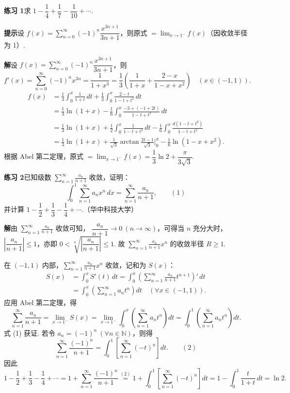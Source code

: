 \documentclass[UTF8, 12pt, fontset=fandol, oneside]{ctexart}
\begin{document}
\noindent\textbf{练习 1}\quad 求 $1-\dfrac14+\dfrac17-\dfrac1{10}+\cdots$.

\noindent\textbf{提示}\quad 设
$f(x)=\displaystyle\sum_{n=0}^{\infty}(-1)^n\dfrac{x^{3n+1}}{3n+1}$，则原式
$=\displaystyle\lim_{x\to1^-}f(x)$（因收敛半径为 1）.

\noindent\textbf{解}\quad 设 $f(x)=\displaystyle\sum_{n=0}^{\infty}(-1)^n\dfrac{x^{3n+1}}{3n+1}$，则
\[
  f'(x)=\sum_{n=0}^{\infty}(-1)^nx^{3n}
  =\frac1{1+x^3}
  =\frac13\left(\frac1{1+x}+\frac{2-x}{1-x+x^2}\right)\quad(x\in(-1,1)).
\]
\[
\begin{aligned}
f(x)
&=\frac13\int_0^x\frac1{1+t}\,dt+\frac13\int_0^x\frac{2-t}{1-t+t^2}\,dt\\
&=\frac13\ln(1+x)-\frac16\int_0^x\frac{-3+(-1+2t)}{1-t+t^2}\,dt\\
&=\frac13\ln(1+x)+\frac12\int_0^x\frac1{1-t+t^2}\,dt
-\frac16\int_0^x\frac{d(1-t+t^2)}{1-t+t^2}\\
&=\frac13\ln(1+x)+\frac1{\sqrt3}\arctan\frac{2t-1}{\sqrt3}\bigg|_0^x
-\frac16\ln(1-x+x^2).
\end{aligned}
\]
根据 Abel 第二定理，原式
$=\displaystyle\lim_{x\to1^-}f(x)=\dfrac13\ln2+\dfrac{\pi}{3\sqrt3}$.

\noindent\textbf{练习 2}\quad 已知级数 $\displaystyle\sum_{n=1}^{\infty}\frac{a_n}{n+1}$ 收敛，证明：
\[
  \int_0^1\sum_{n=1}^{\infty}a_nx^n\,dx=\sum_{n=1}^{\infty}\frac{a_n}{n+1}, \qquad(1)
\]
并计算 $1-\dfrac12+\dfrac13-\dfrac14+\cdots$.（华中科技大学）

\noindent\textbf{解}\quad 由 $\displaystyle\sum_{n=1}^{\infty}\frac{a_n}{n+1}$ 收敛可知，
$\dfrac{a_n}{n+1}\to0\ (n\to\infty)$，可得当 $n$ 充分大时，
$\left|\dfrac{a_n}{n+1}\right|\le1$，亦即
$0<\sqrt[n]{\left|\dfrac{a_n}{n+1}\right|}\le1$. 故
$\displaystyle\sum_{n=1}^{\infty}\frac{a_n}{n+1}x^n$ 的收敛半径 $R\ge1$.

在 $(-1,1)$ 内部，$\displaystyle\sum_{n=1}^{\infty}\frac{a_n}{n+1}x^n$ 收敛，记和为 $S(x)$：
\[
\begin{aligned}
S(x)
&=\int_0^x S'(t)\,dt
=\int_0^x\left(\sum_{n=1}^{\infty}\frac{a_n}{n+1}t^{n+1}\right)'\,dt\\
&=\int_0^x\left(\sum_{n=1}^{\infty}a_nt^n\right)dt\quad(\forall x\in(-1,1)).
\end{aligned}
\]
应用 Abel 第二定理，得
\[
  \sum_{n=1}^{\infty}\frac{a_n}{n+1}
  =\lim_{x\to1^-}S(x)
  =\lim_{x\to1^-}\int_0^x\left(\sum_{n=1}^{\infty}a_nt^n\right)dt
  =\int_0^1\left(\sum_{n=1}^{\infty}a_nt^n\right)dt.
\]
式 (1) 获证. 若令 $a_n=(-1)^n\ (\forall n\in\mathbb N)$，则得
\[
  \sum_{n=1}^{\infty}\frac{(-1)^n}{n+1}
  =\int_0^1\left[\sum_{n=1}^{\infty}(-t)^n\right]dt. \qquad(2)
\]
因此
\[
  1-\frac12+\frac13-\frac14+\cdots
  =1+\sum_{n=1}^{\infty}\frac{(-1)^n}{n+1}
  \stackrel{(2)}{=}1+\int_0^1\left[\sum_{n=1}^{\infty}(-t)^n\right]dt
  =1-\int_0^1\frac{t}{1+t}\,dt=\ln2.
\]
\end{document}
